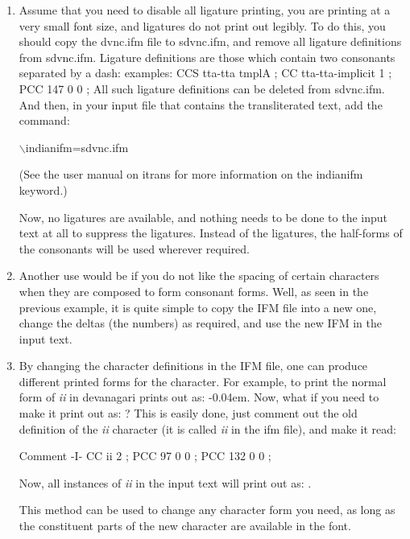 \documentclass[11pt]{article}
\begin{document}
\begin{enumerate}
\item Assume that you need to disable all ligature printing, you
are printing at a very small font size, and ligatures do not print out
legibly.
To do this, you should copy the dvnc.ifm file to sdvnc.ifm, and remove all
ligature definitions from sdvnc.ifm.
Ligature definitions are those which contain two consonants separated by
a dash: examples:
{\obeylines
CCS tta-tta  tmplA ;
CC tta-tta-implicit 1 ; PCC 147 0 0 ;
}
All such ligature definitions can be deleted from sdvnc.ifm.
And then, in your input file that contains the transliterated text, add
the command:

$\backslash$indianifm=sdvnc.ifm

(See the user manual on itrans for more information on the indianifm
keyword.)

Now, no ligatures are available, and nothing needs to be done to the
input text at all to suppress the ligatures.
Instead of the ligatures, the half-forms of the consonants will be used
wherever required.

\item Another use would be if you do not like the spacing of certain
characters when they are composed to form consonant forms.
Well, as seen in the previous example, it is quite simple to copy the IFM
file into a new one, change the deltas (the numbers) as required, and use
the new IFM in the input text.

\item By changing the character definitions in the IFM file, one can
produce different printed forms for the character.
For example, to print the normal form of {\em ii} in devanagari prints out
as: {\devnf {}\kern-0.04em}.
Now, what if you need to make it print out as: {\devnf {}} ?
This is easily done, just comment out the old definition of the {\em ii}
character (it is called {\em ii} in the ifm file), and make it read:

{\obeylines
Comment -I- CC ii 2 ; PCC 97 0 0 ; PCC 132 0 0 ;
}

Now, all instances of {\em ii} in the input text will print out as:
{\devnf {} }.

\renewcommand{\arraystretch}{1.25}
\renewcommand{\arraystretch}{1.25}
\renewcommand{\arraystretch}{1.25}
\renewcommand{\arraystretch}{1.25}
This method can be used to change any character form you need, as long as
the constituent parts of the new character are available in the font.


\end{enumerate}
\end{document}
